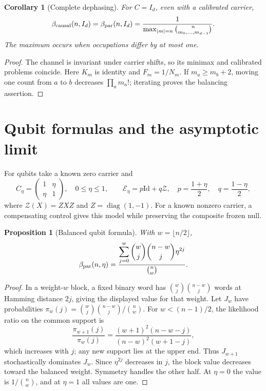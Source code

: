 \documentclass[11pt,a4paper]{article}
\newtheorem{proposition}[theorem]{Proposition}
\newtheorem{corollary}[theorem]{Corollary}
\theoremstyle{remark}
\DeclareMathOperator{\diag}{diag}
\newcommand{\E}{\mathcal E}
\newcommand{\Id}{\mathrm{Id}}
\begin{document}
\begin{corollary}[Complete dephasing]\label{cor:complete}
For \(C=I_d\), even with a calibrated carrier,
\begin{equation}\label{eq:complete}
 \beta_{\rm causal}(n,I_d)
 =\beta_{\rm par}(n,I_d)
 =\frac{1}{\max_{|m|=n}\binom{n}{m_0,\ldots,m_{d-1}}}.
\end{equation}
The maximum occurs when occupations differ by at most one.
\end{corollary}
\begin{proof}
The channel is invariant under carrier shifts, so its minimax and
calibrated problems coincide. Here \(K_m\) is identity and \(F_m=1/N_m\).
If \(m_a\geq m_b+2\), moving one count from \(a\) to \(b\) decreases
\(\prod_a m_a!\); iterating proves the balancing assertion.
\end{proof}

\section{Qubit formulas and the asymptotic limit}

For qubits take a known zero carrier and
\begin{equation}\label{eq:eta}
 C_\eta=\begin{pmatrix}1&\eta\\ \eta&1\end{pmatrix},
 \quad 0\leq\eta\leq1,\qquad
 \E_\eta=p\Id+q\mathcal Z,\quad
 p=\frac{1+\eta}{2},\quad q=\frac{1-\eta}{2},
\end{equation}
where \(\mathcal Z(X)=ZXZ\) and \(Z=\diag(1,-1)\).
For a known nonzero carrier, a compensating control gives this model
while preserving the composite frozen null.

\begin{proposition}[Balanced qubit formula]\label{prop:qubit}
With \(w=\lfloor n/2\rfloor\),
\begin{equation}\label{eq:qubit}
 \beta_{\rm par}(n,\eta)
 =\frac{\displaystyle\sum_{j=0}^{w}
            \binom{w}{j}\binom{n-w}{j}\eta^{2j}}{\binom{n}{w}}.
\end{equation}
\end{proposition}
\begin{proof}
In a weight-\(w\) block, a fixed binary word has
\(\binom wj\binom{n-w}j\) words at Hamming distance \(2j\), giving the
displayed value for that weight.
Let \(J_w\) have probabilities
\(\pi_w(j)=\binom wj\binom{n-w}j/\binom nw\).
For \(w<(n-1)/2\), the likelihood ratio on the common support is
\[
 \frac{\pi_{w+1}(j)}{\pi_w(j)}
 =\frac{(w+1)^2(n-w-j)}{(n-w)^2(w+1-j)},
\]
which increases with \(j\); any new support lies at the upper end.
Thus \(J_{w+1}\) stochastically dominates \(J_w\). Since
\(\eta^{2j}\) decreases in \(j\), the block value decreases toward the
balanced weight. Symmetry handles the other half. At \(\eta=0\) the
value is \(1/\binom nw\), and at \(\eta=1\) all values are one.
\end{proof}
\end{document}
